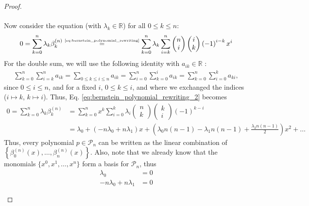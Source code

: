 \begin{proof}
\begin{enumerate}[label=(\alph*)]
\begin{align}
		\end{align}
		Now consider the equation (with $\lambda_k\in\mathbb R$) for all $0\leq k\leq n$:
		\begin{align}\label{eq:bernstein_polynomial_rewriting_2}
			0 = \sum_{k=0}^{n} \lambda_k \beta_{k}^{(n)} \overset{\tiny\eqref{eq:bernstein_polynomial_rewriting}}{=} \sum_{k=0}^{n}\lambda_k\sum_{i=k}^{n}\begin{pmatrix}
				n \\ i
			\end{pmatrix}\begin{pmatrix} i\\ k\end{pmatrix} \left(-1\right)^{i - k} x^{i}
		\end{align}
		For the double sum, we will use the following identity with $a_{ik}\in\mathbb R$ \cite[p. 2]{article:sums}:
		\begin{align}
			\sum_{k=0}^{n}\sum_{i=k}^{n}a_{ik} = \sum_{0\leq k \leq i\leq n} a_{ik} = \sum_{i=0}^{n}\sum_{k=0}^{i}a_{ik} = \sum_{k=0}^{n}\sum_{i=0}^{k}a_{ki},
		\end{align}
		since $0\leq i\leq n$, and for a fixed $i$, $0\leq k\leq i$, and where we exchanged the indices ($i\mapsto k$, $k\mapsto i$). Thus, Eq. \eqref{eq:bernstein_polynomial_rewriting_2} becomes 
		\begin{align}
			0 = \sum_{k=0}^{n} \lambda_k \beta_{k}^{(n)} &= \sum_{k=0}^{n}x^{k}\sum_{i=0}^{k}\lambda_i \begin{pmatrix}
				n \\ k
			\end{pmatrix}\begin{pmatrix} k\\ i\end{pmatrix} \left(-1\right)^{k - i} \label{eq:bernstein_polynomials_lin_indep}
			\\ &= \lambda_0 +\left(-n\lambda_0 + n\lambda_1\right)x + \left(\lambda_0n\left(n-1\right) - \lambda_1 n(n-1) + \frac{\lambda_2 n(n-1)}{2} \right)x^2 + \dots
		\end{align}
		Thus, every polynomial $p\in\mathcal P_n$ can be written as the linear combination of \\ $\left\{ \beta_{0}^{(n)}(x), \dots, \beta_{n}^{(n)}(x) \right\}$. Also, note that we already know that the monomials $\{x^0, x^1, \dots, x^n\}$ form a basis for $\mathcal P_n$, thus 
		\begin{align}
			\lambda_0 &= 0
			\\ -n\lambda_0 + n\lambda_1 &= 0 \label{eq:bernstein_lin_indepen_2}

\end{align}
\end{enumerate}
\end{proof}
